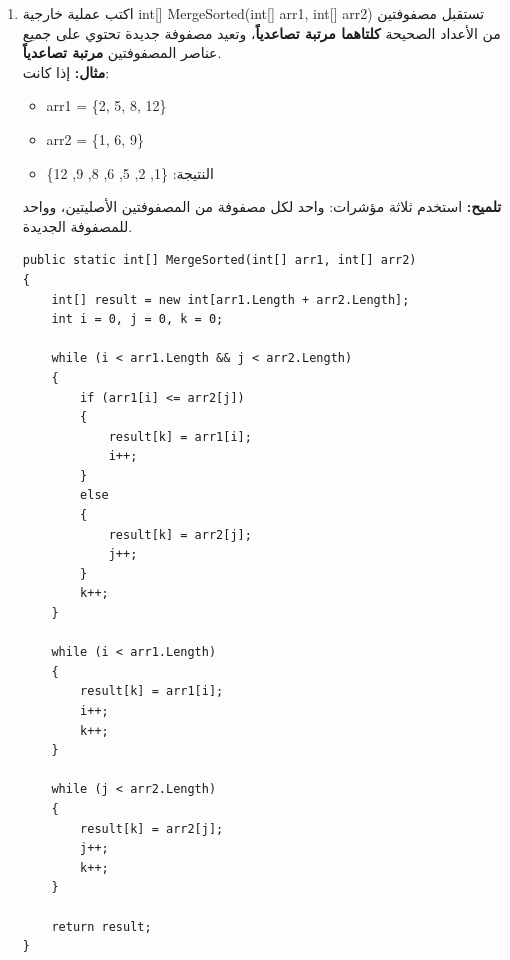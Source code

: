 \documentclass[14pt]{extarticle}
\begin{document}
\begin{enumerate}[resume, itemsep=2em]
\begin{boxSolution}
\begin{english}
\begin{verbatim}
    return merged;
}
    \end{verbatim}
    \end{english}
    \end{boxSolution}
    \fi

    \item
    اكتب عملية خارجية \textenglish{int[] MergeSorted(int[] arr1, int[] arr2)} تستقبل مصفوفتين من الأعداد الصحيحة \textbf{كلتاهما مرتبة تصاعدياً}، وتعيد مصفوفة جديدة تحتوي على جميع عناصر المصفوفتين \textbf{مرتبة تصاعدياً}.\\
    \textbf{مثال:} إذا كانت:
    \begin{itemize}
        \item \textenglish{arr1 = \{2, 5, 8, 12\}}
        \item \textenglish{arr2 = \{1, 6, 9\}}
        \item النتيجة: \textenglish{\{1, 2, 5, 6, 8, 9, 12\}}
    \end{itemize}
    \textbf{تلميح:} استخدم ثلاثة مؤشرات: واحد لكل مصفوفة من المصفوفتين الأصليتين، وواحد للمصفوفة الجديدة.
    \ifwithsols
    \begin{boxSolution}
    \begin{english}
    \begin{verbatim}
public static int[] MergeSorted(int[] arr1, int[] arr2)
{
    int[] result = new int[arr1.Length + arr2.Length];
    int i = 0, j = 0, k = 0;

    while (i < arr1.Length && j < arr2.Length)
    {
        if (arr1[i] <= arr2[j])
        {
            result[k] = arr1[i];
            i++;
        }
        else
        {
            result[k] = arr2[j];
            j++;
        }
        k++;
    }

    while (i < arr1.Length)
    {
        result[k] = arr1[i];
        i++;
        k++;
    }

    while (j < arr2.Length)
    {
        result[k] = arr2[j];
        j++;
        k++;
    }

    return result;
}
    \end{verbatim}
    \end{english}
    \end{boxSolution}
    \fi


\end{enumerate}
\end{document}

